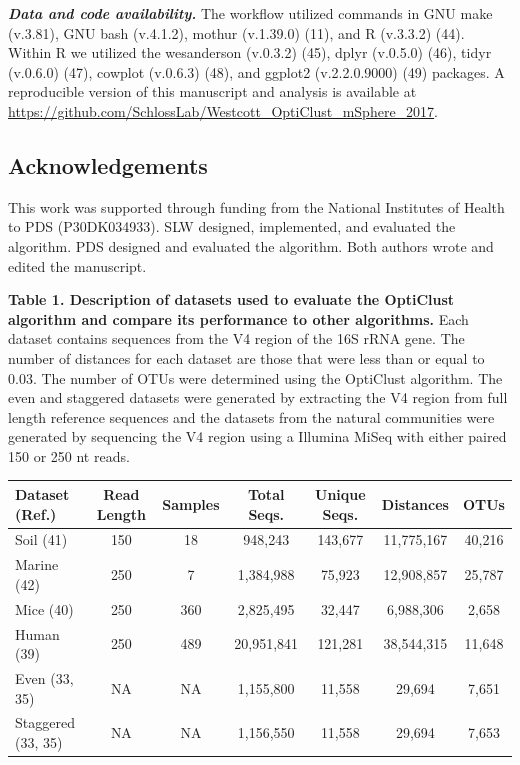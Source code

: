 \documentclass[11pt,]{article}
\begin{document}
\textbf{\emph{Data and code availability.}} The workflow utilized
commands in GNU make (v.3.81), GNU bash (v.4.1.2), mothur (v.1.39.0)
(11), and R (v.3.3.2) (44). Within R we utilized the wesanderson
(v.0.3.2) (45), dplyr (v.0.5.0) (46), tidyr (v.0.6.0) (47), cowplot
(v.0.6.3) (48), and ggplot2 (v.2.2.0.9000) (49) packages. A reproducible
version of this manuscript and analysis is available at
\url{https://github.com/SchlossLab/Westcott_OptiClust_mSphere_2017}.

\subsection{Acknowledgements}\label{acknowledgements}

This work was supported through funding from the National Institutes of
Health to PDS (P30DK034933). SLW designed, implemented, and evaluated
the algorithm. PDS designed and evaluated the algorithm. Both authors
wrote and edited the manuscript.

\newpage

\textbf{Table 1. Description of datasets used to evaluate the OptiClust
algorithm and compare its performance to other algorithms.} Each dataset
contains sequences from the V4 region of the 16S rRNA gene. The number
of distances for each dataset are those that were less than or equal to
0.03. The number of OTUs were determined using the OptiClust algorithm.
The even and staggered datasets were generated by extracting the V4
region from full length reference sequences and the datasets from the
natural communities were generated by sequencing the V4 region using a
Illumina MiSeq with either paired 150 or 250 nt reads.

\begin{longtable}[c]{@{}lcccccc@{}}
\toprule
\textbf{Dataset (Ref.)} & \textbf{Read Length} & \textbf{Samples} &
\textbf{Total Seqs.} & \textbf{Unique Seqs.} & \textbf{Distances} &
\textbf{OTUs}\tabularnewline
\midrule
\endhead
Soil (41) & 150 & 18 & 948,243 & 143,677 & 11,775,167 &
40,216\tabularnewline
Marine (42) & 250 & 7 & 1,384,988 & 75,923 & 12,908,857 &
25,787\tabularnewline
Mice (40) & 250 & 360 & 2,825,495 & 32,447 & 6,988,306 &
2,658\tabularnewline
Human (39) & 250 & 489 & 20,951,841 & 121,281 & 38,544,315 &
11,648\tabularnewline
Even (33, 35) & NA & NA & 1,155,800 & 11,558 & 29,694 &
7,651\tabularnewline
Staggered (33, 35) & NA & NA & 1,156,550 & 11,558 & 29,694 &
7,653\tabularnewline
\bottomrule
\end{longtable}
\end{document}
